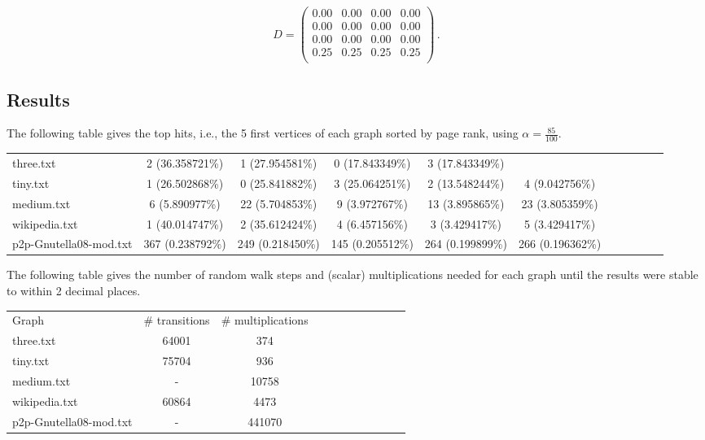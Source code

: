 \documentclass{tufte-handout}
\begin{document}
\begin{equation*}
D =
\left(
\begin{array}{cccc}
0.00 & 0.00 & 0.00 & 0.00 \\
0.00 & 0.00 & 0.00 & 0.00 \\
0.00 & 0.00 & 0.00 & 0.00 \\
0.25 & 0.25 & 0.25 & 0.25 \\
\end{array}
\right)\,.
\end{equation*}

\subsection{Results}

The following table gives the top hits, i.e., the 5 first vertices of
each graph sorted by page rank, using $\alpha = \frac{85}{100}$.



\medskip
\begin{fullwidth}
\small
\begin{tabular}{lcccccccccc}
three.txt & 2 (36.358721\%) & 1 (27.954581\%) & 0 (17.843349\%) & 3 (17.843349\%) \\
tiny.txt &  1 (26.502868\%) & 0 (25.841882\%) & 3 (25.064251\%) & 2 (13.548244\%) & 4 (9.042756\%) \\
medium.txt & 6 (5.890977\%)  & 22 (5.704853\%)  & 9 (3.972767\%) & 13 (3.895865\%) & 23 (3.805359\%) \\
wikipedia.txt & 1 (40.014747\%)  &2 (35.612424\%)  &4 (6.457156\%)  &3 (3.429417\%)  &5 (3.429417\%)  \\
p2p-Gnutella08-mod.txt & 367 (0.238792\%)  &249 (0.218450\%)  &145 (0.205512\%)  &264 (0.199899\%)  &266 (0.196362\%)  &
\end{tabular}
\end{fullwidth}

\bigskip The following table gives the number of random walk steps and
(scalar) multiplications needed for each graph until the results were
stable to within 2 decimal places.

\medskip
\begin{fullwidth}
\small
\begin{tabular}{lcccccccccc}
Graph & \# transitions  & \# multiplications \\
three.txt & 64001 & 374 \\
tiny.txt & 75704 & 936\\
medium.txt & - & 10758\\
wikipedia.txt & 60864 & 4473\\
p2p-Gnutella08-mod.txt & - & 441070
\end{tabular}
\end{fullwidth}
\end{document}
